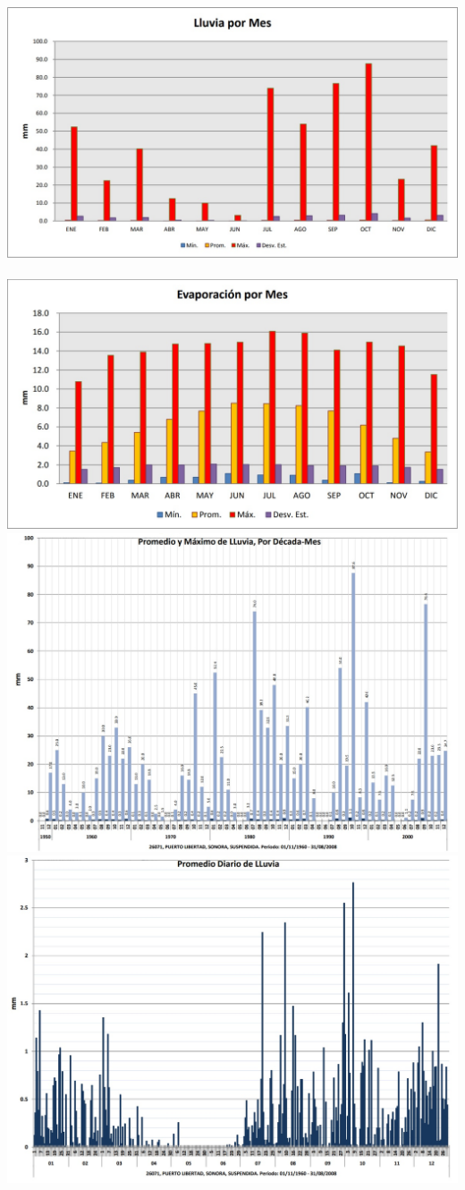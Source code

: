 \documentclass{report}
\begin{document}
\includegraphics[width=0.9\linewidth]{1.jpg}
\\
\\
\noindent
\includegraphics[width=0.9\linewidth]{2.jpg}
\\
\noindent
\includegraphics[width=0.9\linewidth]{3.jpg}
\\
\noindent
\includegraphics[width=0.9\linewidth]{4.jpg}
\end{document}
